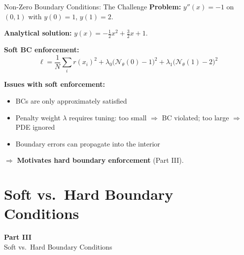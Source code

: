 \documentclass[aspectratio=169,11pt]{beamer}
\newcommand{\emphc}[1]{\textcolor{harvardcrimson}{#1}}
\begin{document}
\begin{frame}{Non-Zero Boundary Conditions: The Challenge}
\textbf{Problem:} $y''(x) = -1$ on $(0,1)$ with $y(0) = 1$, $y(1) = 2$.

\vspace{0.2em}
\textbf{Analytical solution:} $y(x) = -\tfrac{1}{2}x^2 + \tfrac{3}{2}x + 1$.

\vspace{0.4em}
\textbf{Soft BC enforcement:}
\[
\ell = \frac{1}{N}\sum_i r(x_i)^2 + \lambda_0\bigl(\mathcal{N}_\theta(0) - 1\bigr)^2 + \lambda_1\bigl(\mathcal{N}_\theta(1) - 2\bigr)^2
\]

\vspace{0.3em}
\textbf{Issues with soft enforcement:}
\begin{itemize}
    \item BCs are only \emphc{approximately} satisfied
    \item Penalty weight $\lambda$ requires \emphc{tuning}: too small $\Rightarrow$ BC violated; too large $\Rightarrow$ PDE ignored
    \item Boundary errors can \emphc{propagate} into the interior
\end{itemize}

\vspace{0.3em}
$\Rightarrow$ \textbf{Motivates hard boundary enforcement} (Part III).
\end{frame}


\section{Soft vs.\ Hard Boundary Conditions}

\begin{frame}{}
\vfill
\begin{center}
{\Huge \textcolor{uzhblue}{\textbf{Part III}}}\\[12pt]
{\LARGE Soft vs.\ Hard Boundary Conditions}
\end{center}
\vfill
\end{frame}
\end{document}
